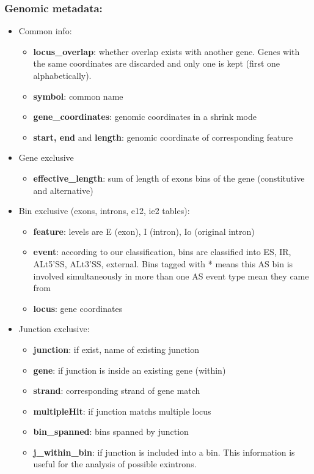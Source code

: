 \documentclass{article}
\begin{document}
\subsubsection*{Genomic metadata:}
\begin{itemize}
\item Common info:
    \begin{itemize}
    \item \textbf{locus\_overlap}: whether overlap exists with another gene. Genes with the same coordinates are discarded and only one is kept (first one alphabetically).    
    \item \textbf{symbol}: common name
    \item \textbf{gene\_coordinates}: genomic coordinates in a shrink mode
    \item \textbf{start, end}  and \textbf{length}: genomic coordinate of corresponding feature
  \end{itemize}
\item Gene exclusive 
  \begin{itemize}
  \item \textbf{effective\_length}: sum of length of exons bins of the gene (constitutive and alternative)
  \end{itemize}
\item Bin exclusive (exons, introns, e12, ie2 tables):
\begin{itemize}
    \item \textbf{feature}: levels are E (exon), I (intron), Io (original intron)
    \item \textbf{event}: according to our classification, bins are classified into ES, IR, ALt5'SS, ALt3'SS, external. Bins tagged with * means this AS bin is involved simultaneously in more than one AS event type mean they came from 
  \item \textbf{locus}: gene coordinates
\end{itemize}
\item Junction exclusive:
  \begin{itemize}
  \item \textbf{junction}: if exist, name of existing junction 
   \item \textbf{gene}: if junction is inside  an existing gene (within)
  \item \textbf{strand}: corresponding strand of gene match
  \item \textbf{multipleHit}: if junction matchs multiple locus
  \item \textbf{bin\_spanned}: bins  spanned by junction 
  \item \textbf{j\_within\_bin}: if junction is included  into a bin. This information is useful for the analysis of possible exintrons. 
\end{itemize}
\end{itemize} 
\end{document}
